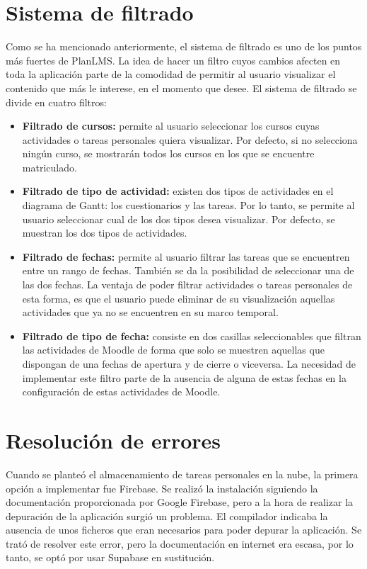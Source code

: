 \section{Sistema de filtrado}
Como se ha mencionado anteriormente, el sistema de filtrado es uno de los puntos más fuertes de PlanLMS. La idea de hacer un filtro cuyos cambios afecten en toda la aplicación parte de la comodidad de permitir al usuario visualizar el contenido que más le interese, en el momento que desee. El sistema de filtrado se divide en cuatro filtros:
\begin{itemize}
    \item \textbf{Filtrado de cursos:} permite al usuario seleccionar los cursos cuyas actividades o tareas personales quiera visualizar. Por defecto, si no selecciona ningún curso, se mostrarán todos los cursos en los que se encuentre matriculado.
    \item \textbf{Filtrado de tipo de actividad:} existen dos tipos de actividades en el diagrama de Gantt: los cuestionarios y las tareas. Por lo tanto, se permite al usuario seleccionar cual de los dos tipos desea visualizar. Por defecto, se muestran los dos tipos de actividades.
    \item \textbf{Filtrado de fechas:} permite al usuario filtrar las tareas que se encuentren entre un rango de fechas. También se da la posibilidad de seleccionar una de las dos fechas. La ventaja de poder filtrar actividades o tareas personales de esta forma, es que el usuario puede eliminar de su visualización aquellas actividades que ya no se encuentren en su marco temporal.
    \item \textbf{Filtrado de tipo de fecha:} consiste en dos casillas seleccionables que filtran las actividades de Moodle de forma que solo se muestren aquellas que dispongan de una fechas de apertura y de cierre o viceversa. La necesidad de implementar este filtro parte de la ausencia de alguna de estas fechas en la configuración de estas actividades de Moodle.
\end{itemize}

\section{Resolución de errores}
Cuando se planteó el almacenamiento de tareas personales en la nube, la primera opción a implementar fue Firebase. Se realizó la instalación siguiendo la documentación proporcionada por Google Firebase, pero a la hora de realizar la depuración de la aplicación surgió un problema. El compilador indicaba la ausencia de unos ficheros que eran necesarios para poder depurar la aplicación. Se trató de resolver este error, pero la documentación en internet era escasa, por lo tanto, se optó por usar Supabase en sustitución.
